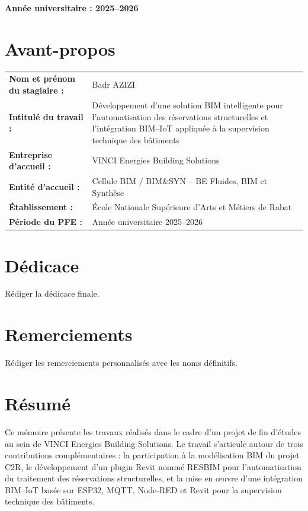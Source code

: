 \documentclass[12pt,a4paper]{report}
\begin{document}
\begin{titlepage}
\vfill

{\fontsize{12}{15}\selectfont\bfseries Année universitaire : 2025--2026\par}

\restoregeometry
\end{titlepage}


\chapter*{Avant-propos}
\begin{longtable}{>{\bfseries}p{5.0cm}p{9.5cm}}
Nom et prénom du stagiaire : & Badr AZIZI \\
Intitulé du travail : & Développement d'une solution BIM intelligente pour l'automatisation des réservations structurelles et l'intégration BIM--IoT appliquée à la supervision technique des bâtiments \\
Entreprise d'accueil : & VINCI Energies Building Solutions \\
Entité d'accueil : & Cellule BIM / BIM\&SYN -- BE Fluides, BIM et Synthèse \\
Établissement : & École Nationale Supérieure d'Arts et Métiers de Rabat \\
Période du PFE : & Année universitaire 2025--2026 \\
\end{longtable}

\chapter*{Dédicace}
Rédiger la dédicace finale.

\chapter*{Remerciements}
Rédiger les remerciements personnalisés avec les noms définitifs.

\chapter*{Résumé}
Ce mémoire présente les travaux réalisés dans le cadre d'un projet de fin d'études au sein de VINCI Energies Building Solutions. Le travail s'articule autour de trois contributions complémentaires : la participation à la modélisation BIM du projet C2R, le développement d'un plugin Revit nommé RESBIM pour l'automatisation du traitement des réservations structurelles, et la mise en œuvre d'une intégration BIM--IoT basée sur ESP32, MQTT, Node-RED et Revit pour la supervision technique des bâtiments.
\end{document}
